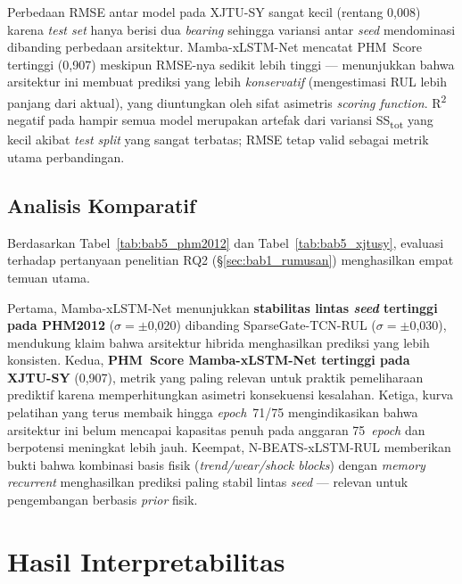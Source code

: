 Perbedaan RMSE antar model pada XJTU-SY sangat kecil (rentang 0{,}008) karena
\emph{test set} hanya berisi dua \emph{bearing} sehingga variansi antar \emph{seed}
mendominasi dibanding perbedaan arsitektur. Mamba-xLSTM-Net mencatat
PHM~Score tertinggi (0{,}907) meskipun RMSE-nya sedikit lebih tinggi ---
menunjukkan bahwa arsitektur ini membuat prediksi yang lebih \emph{konservatif}
(mengestimasi RUL lebih panjang dari aktual), yang diuntungkan oleh sifat
asimetris \emph{scoring function}.
R\textsuperscript{2} negatif pada hampir semua model merupakan artefak dari
variansi SS\textsubscript{tot} yang kecil akibat \emph{test split} yang sangat
terbatas; RMSE tetap valid sebagai metrik utama perbandingan.

\subsection{Analisis Komparatif}
\label{subsec:bab5_komparatif}

Berdasarkan Tabel~\ref{tab:bab5_phm2012} dan Tabel~\ref{tab:bab5_xjtusy},
evaluasi terhadap pertanyaan penelitian RQ2 (§\ref{sec:bab1_rumusan}) menghasilkan
empat temuan utama.

Pertama, Mamba-xLSTM-Net menunjukkan \textbf{stabilitas lintas \emph{seed}
tertinggi pada PHM2012} ($\sigma = \pm$0{,}020) dibanding SparseGate-TCN-RUL
($\sigma = \pm$0{,}030), mendukung klaim bahwa arsitektur hibrida menghasilkan
prediksi yang lebih konsisten.
Kedua, \textbf{PHM~Score Mamba-xLSTM-Net tertinggi pada XJTU-SY} (0{,}907),
metrik yang paling relevan untuk praktik pemeliharaan prediktif karena
memperhitungkan asimetri konsekuensi kesalahan.
Ketiga, kurva pelatihan yang terus membaik hingga \emph{epoch}~71/75
mengindikasikan bahwa arsitektur ini belum mencapai kapasitas penuh pada
anggaran 75~\emph{epoch} dan berpotensi meningkat lebih jauh.
Keempat, N-BEATS-xLSTM-RUL memberikan bukti bahwa kombinasi basis fisik
(\emph{trend/wear/shock blocks}) dengan \emph{memory recurrent} menghasilkan
prediksi paling stabil lintas \emph{seed} --- relevan untuk pengembangan
berbasis \emph{prior} fisik.

\section{Hasil Interpretabilitas}
\label{sec:bab5_interpretabilitas}

